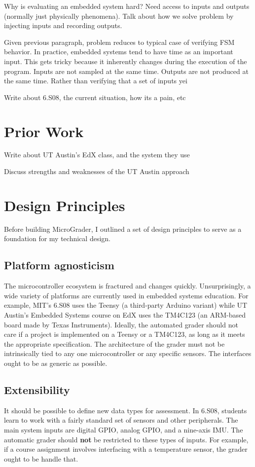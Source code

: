 \documentclass[12pt]{article}
\begin{document}
Why is evaluating an embedded system hard?  Need access to inputs and outputs (normally just physically phenomena).  Talk about how we solve problem by injecting inputs and recording outputs.

Given previous paragraph, problem reduces to typical case of verifying FSM behavior.  In practice, embedded systems tend to have time as an important input.  This gets tricky because it inherently changes during the execution of the program.  Inputs are not sampled at the same time.  Outputs are not produced at the same time.  Rather than verifying that a set of inputs yei

Write about 6.S08, the current situation, how its a pain, etc

\newpage
\section{Prior Work}
Write about UT Austin's EdX class, and the system they use

Discuss strengths and weaknesses of the UT Austin approach

\newpage
\section{Design Principles}
Before building MicroGrader, I outlined a set of design principles to serve as a foundation for my technical design.

\subsection{Platform agnosticism}
The microcontroller ecosystem is fractured and changes quickly.  Unsurprisingly, a wide variety of platforms are currently used in embedded systems education.  For example, MIT's 6.S08 uses the Teensy (a third-party Arduino variant) while UT Austin's Embedded Systems course on EdX uses the TM4C123 (an ARM-based board made by Texas Instruments).  Ideally, the automated grader should not care if a project is implemented on a Teensy or a TM4C123, as long as it meets the appropriate specification. The architecture of the grader must not be intrinsically tied to any one microcontroller or any specific sensors.  The interfaces ought to be as generic as possible.

\subsection{Extensibility}
It should be possible to define new data types for assessment.  In 6.S08, students learn to work with a fairly standard set of sensors and other peripherals.  The main system inputs are digital GPIO, analog GPIO, and a nine-axis IMU.  The automatic grader should \textbf{not} be restricted to these types of inputs.  For example, if a course assignment involves interfacing with a temperature sensor, the grader ought to be handle that.
\end{document}
